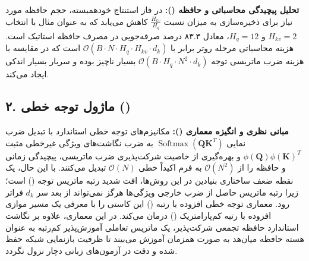 \textbf{تحلیل پیچیدگی محاسباتی و حافظه ():}
در فاز استنتاج خودهمبسته، حجم حافظه مورد نیاز برای ذخیره‌سازی  به میزان نسبت $\frac{H_{kv}}{H_q}$ کاهش می‌یابد که به عنوان مثال با انتخاب $H_{kv} = 2$ و $H_q = 12$، معادل ۸۳.۳ درصد صرفه‌جویی در مصرف حافظه استاتیک است. هزینه محاسباتی مرحله روتر برابر با $\mathcal{O}(B \cdot N \cdot H_q \cdot H_{kv} \cdot d_k)$ است که در مقایسه با هزینه ضرب ماتریسی توجه $\mathcal{O}(B \cdot H_q \cdot N^2 \cdot d_k)$ بسیار ناچیز بوده و سربار بسیار اندکی ایجاد می‌کند.



\subsection*{۲. ماژول توجه خطی  ()}

\textbf{مبانی نظری و انگیزه معماری ():}
مکانیزم‌های توجه خطی استاندارد با تبدیل ضرب نمایی $\operatorname{Softmax}(\mathbf{Q}\mathbf{K}^T)$ به ضرب نگاشت‌های ویژگی غیرخطی مثبت $\phi(\mathbf{Q})\phi(\mathbf{K})^T$ و بهره‌گیری از خاصیت شرکت‌پذیری ضرب ماتریسی، پیچیدگی زمانی و حافظه را از $\mathcal{O}(N^2)$ به فرم اکیداً خطی $\mathcal{O}(N)$ تبدیل می‌کنند. با این حال، یک نقطه ضعف ساختاری بنیادین در این روش‌ها، افت شدید رتبه ماتریس توجه () است؛ زیرا رتبه ماتریس حاصل از ضرب خارجی ویژگی‌ها هرگز نمی‌تواند از بعد سر $d_k$ فراتر رود.
معماری توجه خطی افزوده با رتبه () این کاستی را با معرفی یک مسیر موازی افزوده با رتبه کم‌پارامتریک () درمان می‌کند. در این معماری، علاوه بر نگاشت استاندارد حافظه تجمعی شرکت‌پذیر، یک ماتریس تعاملی آموزش‌پذیر کم‌رتبه به عنوان هسته حافظه میان‌هد به صورت همزمان آموزش می‌بیند تا ظرفیت بازنمایی شبکه حفظ شده و دقت در آزمون‌های زبانی دچار نزول نگردد.


